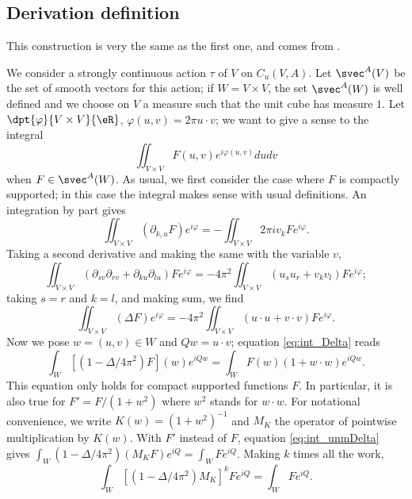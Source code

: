 \subsection{Derivation definition}

This construction is very the same as the first one, and comes from \cite{Rieffel}.

We consider a strongly continuous action $\tau$ of $V$ on $ C_u(V,A)$. Let $\svec^A(V)$ be the set of smooth vectors for this action; if $W=V\times V$, the set $\svec^A(W)$ is well defined and we choose on $V$ a measure such that the unit cube has measure $1$. Let $\dpt{\varphi}{V\times V}{\eR}$, $\varphi(u,v)=2\pi u\cdot v$; we want to give a sense to the integral
\[
	\iint_{V\times V}F(u,v)e^{i\varphi(u,v)}dudv
\]
when $F\in\svec^A(W)$. As usual, we first consider the case where $F$ is compactly supported; in this case the integral makes sense with usual definitions. An integration by part gives
\[
	\iint_{V\times V}(\partial_{k,u}F)e^{i\varphi}=-\iint_{V\times V}2\pi i v_k Fe^{i\varphi}.
\]
Taking a second derivative and making the same with the variable $v$,
\[
	\iint_{V\times V}(\partial_{sv}\partial_{rv}+\partial_{ku}\partial_{lu})Fe^{i\varphi}=-4\pi^2\iint_{V\times V}(u_su_r+v_kv_l)Fe^{i\varphi};
\]
taking $s=r$ and $k=l$, and making sum, we find
\begin{equation} \label{eq:int_Delta}
	\iint_{V\times V}(\Delta F)e^{i\varphi}=-4\pi^2\iint_{V\times V} (u\cdot u+v\cdot v)Fe^{i\varphi}.
\end{equation}
Now we pose $w=(u,v)\in W$ and $Qw=u\cdot v$;  equation \eqref{eq:int_Delta} reads
\begin{equation} \label{eq:int_unmDelta}
	\int_W[(1-\Delta/4\pi^2)F](w)e^{iQw}=\int_WF(w)(1+w\cdot w)e^{iQw}.
\end{equation}
This equation only holds for compact supported functions $F$. In particular, it is also true for $F'=F/(1+w^2)$ where $w^2$ stands for $w\cdot w$. For notational convenience, we write $K(w)=(1+w^2)^{-1}$ and $M_K$ the operator of pointwise multiplication by $K(w)$. With $F'$ instead of $F$, equation \eqref{eq:int_unmDelta} gives $\int_W(1- \Delta/4\pi^2)(M_KF)e^{iQ}=\int_W Fe^{iQ}$. Making $k$ times all the work,
\begin{equation}
	\int_W [(1-\Delta/4\pi^2)M_K]^kFe^{iQ}=\int_WFe^{iQ}.
\end{equation}

